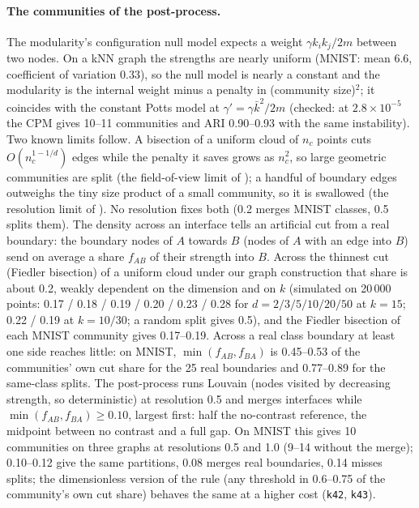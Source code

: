 \documentclass[11pt]{article}
\begin{document}
\paragraph{The communities of the post-process.} The modularity's configuration null model expects a weight
$\gamma k_i k_j / 2m$ between two nodes. On a kNN graph the strengths are nearly uniform (MNIST: mean 6.6,
coefficient of variation 0.33), so the null model is nearly a constant and the modularity is the internal weight
minus a penalty in (community size)$^2$; it coincides with the constant Potts model at $\gamma' = \gamma
\bar{k}^2 / 2m$ (checked: at $2.8 \times 10^{-5}$ the CPM gives 10--11 communities and ARI 0.90--0.93 with the
same instability). Two known limits follow. A bisection of a uniform cloud of $n_c$ points cuts $O(n_c^{1-1/d})$
edges while the penalty it saves grows as $n_c^2$, so large geometric communities are split (the field-of-view limit
of \citet{schaub2012markov}); a handful of boundary edges outweighs the tiny size product of a small community, so
it is swallowed (the resolution limit of \citet{fortunato2007resolution}). No resolution fixes both (0.2 merges MNIST
classes, 0.5 splits them). The density across an interface tells an artificial cut from a real boundary: the
boundary nodes of $A$ towards $B$ (nodes of $A$ with an edge into $B$) send on average a share $f_{AB}$ of their
strength into $B$. Across the thinnest cut (Fiedler bisection) of a uniform cloud under our graph construction that
share is about 0.2, weakly dependent on the dimension and on $k$ (simulated on 20\,000 points: 0.17 / 0.18 / 0.19 /
0.20 / 0.23 / 0.28 for $d = 2 / 3 / 5 / 10 / 20 / 50$ at $k = 15$; 0.22 / 0.19 at $k = 10 / 30$; a random split gives
0.5), and the Fiedler bisection of each MNIST community gives 0.17--0.19. Across a real class boundary at least one
side reaches little: on MNIST, $\min(f_{AB}, f_{BA})$ is 0.45--0.53 of the communities' own cut share for the 25 real
boundaries and 0.77--0.89 for the same-class splits. The post-process runs Louvain (nodes visited by decreasing
strength, so deterministic) at resolution 0.5 and merges interfaces while $\min(f_{AB}, f_{BA}) \ge 0.10$, largest
first: half the no-contrast reference, the midpoint between no contrast and a full gap. On MNIST this gives 10
communities on three graphs at resolutions 0.5 and 1.0 (9--14 without the merge); 0.10--0.12 give the same
partitions, 0.08 merges real boundaries, 0.14 misses splits; the dimensionless version of the rule (any threshold in
0.6--0.75 of the community's own cut share) behaves the same at a higher cost (\texttt{k42}, \texttt{k43}).
\end{document}
